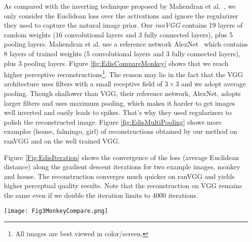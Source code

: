 \documentclass{article}
\begin{document}
As compared with the inverting technique proposed by Mahendran et al.~\cite{Mahendran2015CVPR},
we only consider the Euclidean loss over the activations and ignore the regularizer they used to capture the natural image prior.
Our \emph{ranVGG} contains 19 layers of random weights (16 convolutional layers and 3 fully connected layers), plus 5 pooling layers.
Mahendran et al. use a reference network AlexNet~\cite{Alex2012NIPS} which contains 8 layers of trained weights (5 convolutional layers and 3 fully connected layers), plus 3 pooling layers. Figure \ref{fig:EdisCompareMonkey} shows that we reach higher perceptive reconstructions\footnote{All images are best viewed in color/screen.}.
The reason may lie in the fact that the VGG architecture uses filters with a small receptive field of $3 \times 3$ and we adopt average pooling.
Though shallower than VGG, their reference network, AlexNet, adopts larger filters
 and uses maximum pooling, which makes it harder to get images well inverted and easily leads to spikes. That's why they used regularizers to polish the reconstructed image.
Figure \ref{fig:EdisMultiPooling} shows more examples (house, falmingo, girl) of reconstructions obtained by our method on ranVGG and on the well trained VGG.

Figure \ref{Fig:EdisIteration} shows the convergence of the loss (average Euclidean distance) along the gradient descent iterations for two example images, monkey and house.
The reconstruction converges much quicker on ranVGG and yields higher perceptual quality results. Note that the reconstruction on VGG remains the same even if we double the iteration limits to 4000 iterations.
\begin{figure*}[htbp]
    \centering
	\vspace{-0.5em}
	\texttt{[image: Fig3MonkeyCompare.png]}
	\vspace{-0.5em}
	\caption{\textbf{Reconstructions from layers of ranVGG (top) and the pretrained VGG (middle) and \cite{Mahendran2015CVPR} (bottom).} As AlexNet only contains 3 pooling layers, we compare their results on conv3 and conv4 with ours on pool3 and pool4. Our method on ranVGG demonstrates a higher perceptive quality, especially on the higher layers. Note that VGG is much deeper than AlexNet even when we compare on the same pooling layer.} %
	\label{fig:EdisCompareMonkey} %
\end{figure*}
\end{document}
